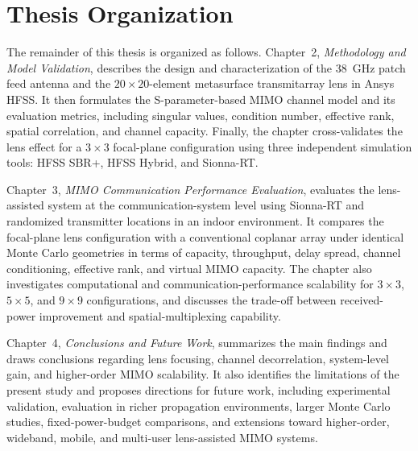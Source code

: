 \section{Thesis Organization}

The remainder of this thesis is organized as follows. Chapter~2, \textit{Methodology and Model Validation}, describes the design and characterization of the 38~GHz patch feed antenna and the $20\times20$-element metasurface transmitarray lens in Ansys HFSS. It then formulates the S-parameter-based MIMO channel model and its evaluation metrics, including singular values, condition number, effective rank, spatial correlation, and channel capacity. Finally, the chapter cross-validates the lens effect for a $3\times3$ focal-plane configuration using three independent simulation tools: HFSS SBR+, HFSS Hybrid, and Sionna-RT.

Chapter~3, \textit{MIMO Communication Performance Evaluation}, evaluates the lens-assisted system at the communication-system level using Sionna-RT and randomized transmitter locations in an indoor environment. It compares the focal-plane lens configuration with a conventional coplanar array under identical Monte Carlo geometries in terms of capacity, throughput, delay spread, channel conditioning, effective rank, and virtual MIMO capacity. The chapter also investigates computational and communication-performance scalability for $3\times3$, $5\times5$, and $9\times9$ configurations, and discusses the trade-off between received-power improvement and spatial-multiplexing capability.

Chapter~4, \textit{Conclusions and Future Work}, summarizes the main findings and draws conclusions regarding lens focusing, channel decorrelation, system-level gain, and higher-order MIMO scalability. It also identifies the limitations of the present study and proposes directions for future work, including experimental validation, evaluation in richer propagation environments, larger Monte Carlo studies, fixed-power-budget comparisons, and extensions toward higher-order, wideband, mobile, and multi-user lens-assisted MIMO systems.






